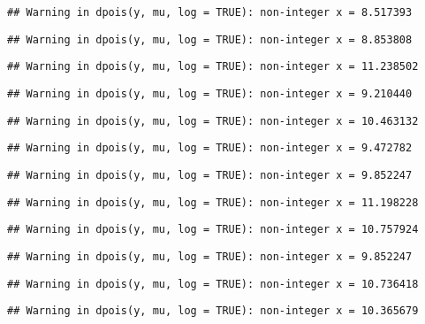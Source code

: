 \documentclass[
]{article}
\begin{document}
\begin{verbatim}
## Warning in dpois(y, mu, log = TRUE): non-integer x = 8.517393
\end{verbatim}

\begin{verbatim}
## Warning in dpois(y, mu, log = TRUE): non-integer x = 8.853808
\end{verbatim}

\begin{verbatim}
## Warning in dpois(y, mu, log = TRUE): non-integer x = 11.238502
\end{verbatim}

\begin{verbatim}
## Warning in dpois(y, mu, log = TRUE): non-integer x = 9.210440
\end{verbatim}

\begin{verbatim}
## Warning in dpois(y, mu, log = TRUE): non-integer x = 10.463132
\end{verbatim}

\begin{verbatim}
## Warning in dpois(y, mu, log = TRUE): non-integer x = 9.472782
\end{verbatim}

\begin{verbatim}
## Warning in dpois(y, mu, log = TRUE): non-integer x = 9.852247
\end{verbatim}

\begin{verbatim}
## Warning in dpois(y, mu, log = TRUE): non-integer x = 11.198228
\end{verbatim}

\begin{verbatim}
## Warning in dpois(y, mu, log = TRUE): non-integer x = 10.757924
\end{verbatim}

\begin{verbatim}
## Warning in dpois(y, mu, log = TRUE): non-integer x = 9.852247
\end{verbatim}

\begin{verbatim}
## Warning in dpois(y, mu, log = TRUE): non-integer x = 10.736418
\end{verbatim}

\begin{verbatim}
## Warning in dpois(y, mu, log = TRUE): non-integer x = 10.365679
\end{verbatim}
\end{document}
